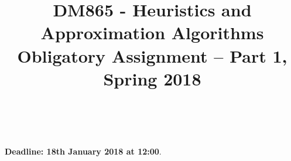 \documentclass[a4paper,10pt]{article}
\title{\begin{flushleft}
DM865 - Heuristics and Approximation Algorithms\\[0.3cm]
{\Large Obligatory Assignment -- Part 1, Spring 2018 %
}
\\
\hrulefill
\\[-1.8cm]
\end{flushleft}
}
\author{}
\date{}
\begin{document}
\maketitle

\begin{center}
{\textbf{Deadline: 18th January 2018 at 12:00}.}
\end{center}
\bigskip









\end{document}
